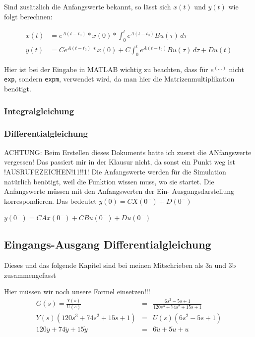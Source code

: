 Sind zusätzlich die Anfangswerte bekannt, so lässt sich $x(t)$ und $y(t)$ wie folgt berechnen:

\begin{align*}
    x(t) & = e^{A(t-t_0)} * x(0) * \int_{0}^{t} e^{A(t-t_0)}Bu(\tau) \,d\tau \nonumber \\
    y(t) & = Ce^{A(t-t_0)} * x(0) + C \int_{0}^{t} e^{A(t-t_0)}Bu(\tau) \,d\tau + Du(t)
\end{align*}

Hier ist bei der Eingabe in MATLAB wichtig zu beachten, dass für $e^{(\ldots)}$ nicht \texttt{exp}, sondern \texttt{expm}, verwendet wird, da man hier die Matrizenmultiplikation benötigt.

\subsubsection{Integralgleichung}
\subsubsection{Differentialgleichung}

ACHTUNG: Beim Erstellen dieses Dokuments hatte ich zuerst die ANfangswerte vergessen! Das passiert mir in der Klausur nicht, da sonst ein Punkt weg ist !AUSRUFEZEICHEN!11!!1!
Die Anfangswerte werden für die Simulation natürlich benötigt, weil die Funktion wissen muss, wo sie startet.
Die Anfangswerte müssen mit den Anfangswerten der Ein-  Ausgangsdarstellung korrespondieren. 
Das bedeutet $y(0) = CX(0^-) + D(0^-)$

$ \dot y(0^-) = CAx(0^-) + CBu(0^-) + D \dot u (0^-)$

\subsection{Eingangs-Ausgang Differentialgleichung}

Dieses und das folgende Kapitel sind bei meinen Mitschrieben als 3a und 3b zusammengefasst

Hier müssen wir noch unsere Formel einsetzen!!!
\begin{eqnarray*}
    G(s) =\frac{Y(s)}{U(s)} &=& \frac{6s^2 - 5s + 1}{120s^3 + 74s^2 + 15s +1} \\
    Y(s)(120s^3 + 74s^2 + 15s +1) &=& U(s) (6s^2 - 5s + 1) \\
    120 \dddot y + 74 \ddot y + 15 \dot y &=& 6 \ddot u + 5 \dot u + u \\
\end{eqnarray*}

